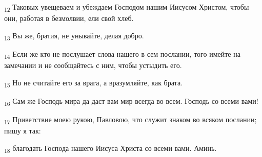 \begin{tcolorbox}
\textsubscript{12} Таковых увещеваем и убеждаем Господом нашим Иисусом Христом, чтобы они, работая в безмолвии, ели свой хлеб.
\end{tcolorbox}
\begin{tcolorbox}
\textsubscript{13} Вы же, братия, не унывайте, делая добро.
\end{tcolorbox}
\begin{tcolorbox}
\textsubscript{14} Если же кто не послушает слова нашего в сем послании, того имейте на замечании и не сообщайтесь с ним, чтобы устыдить его.
\end{tcolorbox}
\begin{tcolorbox}
\textsubscript{15} Но не считайте его за врага, а вразумляйте, как брата.
\end{tcolorbox}
\begin{tcolorbox}
\textsubscript{16} Сам же Господь мира да даст вам мир всегда во всем. Господь со всеми вами!
\end{tcolorbox}
\begin{tcolorbox}
\textsubscript{17} Приветствие моею рукою, Павловою, что служит знаком во всяком послании; пишу я так:
\end{tcolorbox}
\begin{tcolorbox}
\textsubscript{18} благодать Господа нашего Иисуса Христа со всеми вами. Аминь.
\end{tcolorbox}
